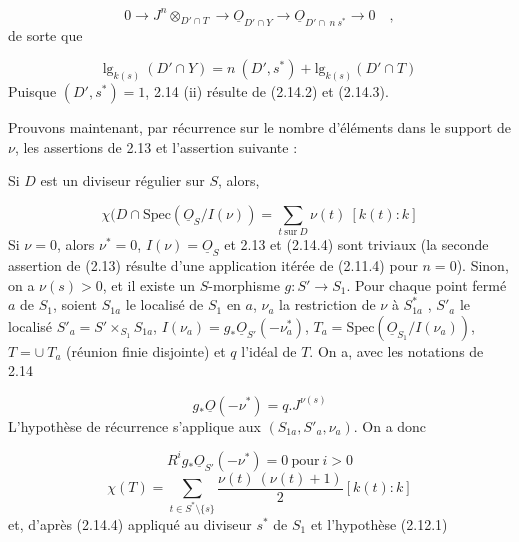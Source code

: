 \begin{equation*}
0 \longrightarrow J^n \otimes_{D'\cap T} \longrightarrow \underline{O}_{D'\cap Y} \longrightarrow \underline{O}_{D'\cap\ n\ s^*} \longrightarrow 0 \quad ,
\end{equation*}
de sorte que 



\begin{equation}\tag{2.14.3}
\mathrm{lg}_{k(s)}\ (D' \cap Y) = n\ (D',s^*) + \mathrm{lg}_{k(s)}(D' \cap T)
\end{equation}
Puisque $(D',s^*) = 1$, 2.14 (ii) résulte de (2.14.2) et (2.14.3).

Prouvons maintenant, par récurrence sur le nombre d'éléments dans le support de $\nu$, les assertions de 2.13 et l'assertion suivante :

Si $D$ est un diviseur régulier sur $S$, alors,

\begin{equation*}
\chi(D \cap \mathrm{Spec}(\underline{O}_S/I(\nu)) = \sum_{t\ \mathrm{sur}\ D} \nu(t)\ [k(t) : k]
\end{equation*}
Si $\nu = 0$, alors $\nu^* = 0$, $I(\nu) = \underline{O}_S$ et 2.13 et (2.14.4) sont triviaux (la seconde assertion de (2.13) résulte d'une application itérée de (2.11.4) pour $n = 0$). Sinon, on a $\nu(s) > 0$, et il existe un $S$-morphisme $g : S' \longrightarrow S_1$. Pour chaque point fermé $a$ de $S_1$, soient $S_{1a}$ le localisé de $S_1$ en $a$, $\nu_a$ la restriction de $\nu$ à $S_{1a}^*$ , $S'_a$ le localisé $S'_a = S' \times_{S_1} S_{1a}$, $I(\nu_a) = g_* \underline{O}_{S'}(-\nu_a^*)$, $T_a = \mathrm{Spec}(\underline{O}_{S_1}/I(\nu_a))$, $T = \cup\ T_a$ (réunion finie disjointe) et $q$ l'idéal de $T$. On a, avec les notations de 2.14

\begin{equation}\tag{2.14.5}
g_* \underline{O}(-\nu^*) = q.J^{\nu(s)}
\end{equation}
L'hypothèse de récurrence s'applique aux $(S_{1a}, S'_a, \nu_a)$. On a donc

\begin{equation}\tag{2.14.6}
R^i g_* \underline{O}_{S'}(-\nu^*) = 0 \ \mathrm{pour}\ i > 0
\end{equation}
\begin{equation}\tag{2.14.7}
\chi(T) = \sum_{t \in S^* \setminus \{s\}} \frac{\nu(t)\ (\nu(t)+1)}{2} [k(t) : k]
\end{equation}
et, d'après (2.14.4) appliqué au diviseur $s^*$ de $S_1$ et l'hypothèse (2.12.1)

